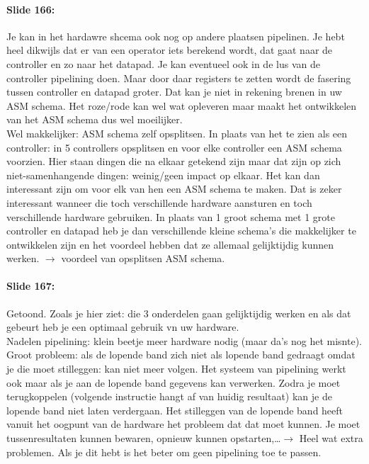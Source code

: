 \documentclass[10pt,a4paper]{book}
\begin{document}
\paragraph{Slide 166:} Je kan in het hardawre shcema ook nog op andere plaatsen pipelinen. Je hebt heel dikwijls dat er van een operator iets berekend wordt, dat gaat naar de controller en zo naar het datapad. Je kan eventueel ook in de lus van de controller pipelining doen. Maar door daar registers te zetten wordt de fasering tussen controller en datapad groter. Dat kan je niet in rekening brenen in uw ASM schema. Het roze/rode kan wel wat opleveren maar maakt het ontwikkelen van het ASM schema dus wel moeilijker.\\
Wel makkelijker: ASM schema zelf opsplitsen. In plaats van het te zien als een controller: in 5 controllers opsplitsen en voor elke controller een ASM schema voorzien. Hier staan dingen die na elkaar getekend zijn maar dat zijn op zich niet-samenhangende dingen: weinig/geen impact op elkaar. Het kan dan interessant zijn om voor elk van hen een ASM schema te maken. Dat is zeker interessant wanneer die toch verschillende hardware aansturen en toch verschillende hardware gebruiken. In plaats van 1 groot schema met 1 grote controller en datapad heb je dan verschillende kleine schema's die makkelijker te ontwikkelen zijn en het voordeel hebben dat ze allemaal gelijktijdig kunnen werken. $\rightarrow$ voordeel van opsplitsen ASM schema.

\paragraph{Slide 167:} Getoond. Zoals je hier ziet: die 3 onderdelen gaan gelijktijdig werken en als dat gebeurt heb je een optimaal gebruik vn uw hardware.\\
Nadelen pipelining: klein beetje meer hardware nodig (maar da's nog het misnte). Groot probleem: als de lopende band zich niet als lopende band gedraagt omdat je die moet stilleggen: kan niet meer volgen. Het systeem van pipelining werkt ook maar als je aan de lopende band gegevens kan verwerken. Zodra je moet terugkoppelen (volgende instructie hangt af van huidig resultaat) kan je de lopende band niet laten verdergaan. Het stilleggen van de lopende band heeft vanuit het oogpunt van de hardware het probleem dat dat moet kunnen. Je moet tussenresultaten kunnen bewaren, opnieuw kunnen opstarten,\ldots $\rightarrow$ Heel wat extra problemen. Als je dit hebt is het beter om geen pipelining toe te passen. 
\end{document}
